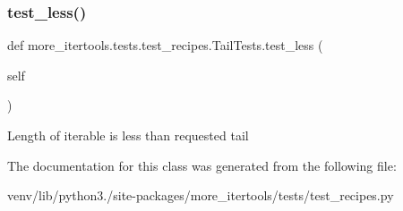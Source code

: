 \subsubsection{\texorpdfstring{test\+\_\+less()}{test\_less()}}
{\footnotesize\ttfamily def more\+\_\+itertools.\+tests.\+test\+\_\+recipes.\+Tail\+Tests.\+test\+\_\+less (\begin{DoxyParamCaption}\item[{}]{self }\end{DoxyParamCaption})}

\begin{DoxyVerb}Length of iterable is less than requested tail\end{DoxyVerb}
 

The documentation for this class was generated from the following file\+:\begin{DoxyCompactItemize}
\item 
venv/lib/python3./site-\/packages/more\+\_\+itertools/tests/test\+\_\+recipes.\+py\end{DoxyCompactItemize}
